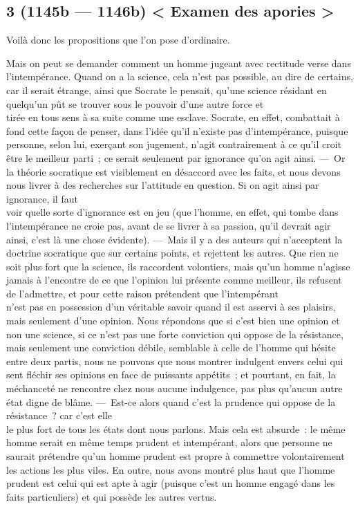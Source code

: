 \documentclass[french,twoside]{book} %
\begin{document}
\subsection[{3 (1145b — 1146b) < Examen des apories >}]{3 (1145b — 1146b) < Examen des apories >}
\noindent Voilà donc les propositions que l’on pose d’ordinaire.\par
Mais on peut se demander comment un homme jugeant avec rectitude verse dans l’intempérance. Quand on a la science, cela n’est pas possible, au dire de certains, car il serait étrange, ainsi que Socrate le pensait, qu’une science résidant en quelqu’un pût se trouver sous le pouvoir d’une autre force et \\
tirée en tous sens à sa suite comme une esclave. Socrate, en effet, combattait à fond cette façon de penser, dans l’idée qu’il n’existe pas d’intempérance, puisque personne, selon lui, exerçant son jugement, n’agit contrairement à ce qu’il croit être le meilleur parti ; ce serait seulement par ignorance qu’on agit ainsi. — Or la théorie socratique est visiblement en désaccord avec les faits, et nous devons nous livrer à des recherches sur l’attitude en question. Si on agit ainsi par ignorance, il faut \\
voir quelle sorte d’ignorance est en jeu (que l’homme, en effet, qui tombe dans l’intempérance ne croie pas, avant de se livrer à sa passion, qu’il devrait agir ainsi, c’est là une chose évidente). — Mais il y a des auteurs qui n’acceptent la doctrine socratique que sur certains points, et rejettent les autres. Que rien ne soit plus fort que la science, ils raccordent volontiers, mais qu’un homme n’agisse jamais à l’encontre de ce que l’opinion lui présente comme meilleur, ils refusent de l’admettre, et pour cette raison prétendent que l’intempérant \\
n’est pas en possession d’un véritable savoir quand il est asservi à ses plaisirs, mais seulement d’une opinion. Nous répondons que si c’est bien une opinion et non une science, si ce n’est pas une forte conviction qui oppose de la résistance,  mais seulement une conviction débile, semblable à celle de l’homme qui hésite entre deux partis, nous ne pouvons que nous montrer indulgent envers celui qui sent fléchir ses opinions en face de puissants appétits ; et pourtant, en fait, la méchanceté ne rencontre chez nous aucune indulgence, pas plus qu’aucun autre état digne de blâme. — Est-ce alors quand c’est la prudence qui oppose de la résistance ? car c’est elle \\
le plus fort de tous les états dont nous parlons. Mais cela est absurde : le même homme serait en même temps prudent et intempérant, alors que personne ne saurait prétendre qu’un homme prudent est propre à commettre volontairement les actions les plus viles. En outre, nous avons montré plus haut que l’homme prudent est celui qui est apte à agir (puisque c’est un homme engagé dans les faits particuliers) et qui possède les autres vertus.\par
\end{document}
